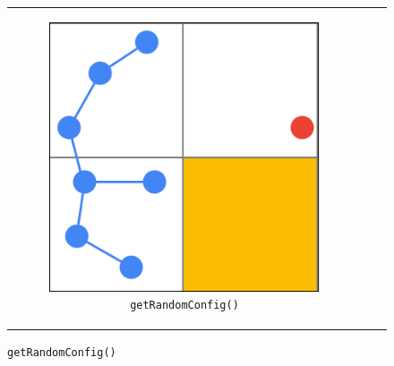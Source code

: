 \begin{figure}[t!]
\begin{centering}
\begin{tabular}{ccc}

    \begin{subfigure}{0.3\linewidth}
    \includegraphics[width=\linewidth]{chapters/chapter2/img/keyfunctions/functions1.png}
    \caption{\texttt{getRandomConfig()}}
    \label{rrt_functions_a}
    \end{subfigure} & 


\end{tabular}
\end{centering}
\end{figure}
